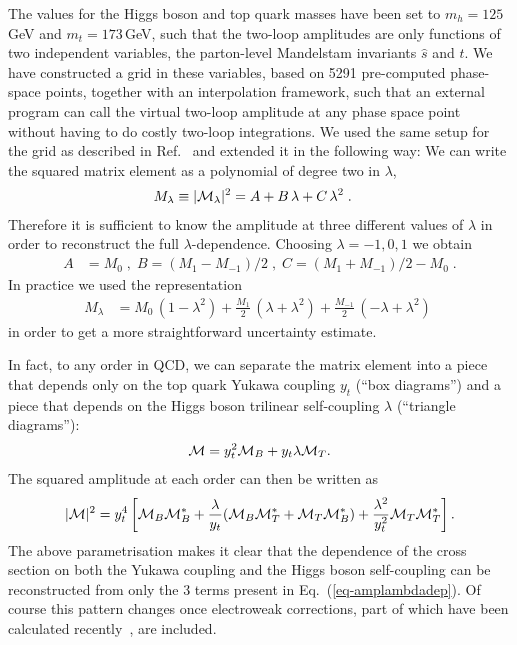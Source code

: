 The values for the Higgs boson and top quark masses have been set to
$m_h=125$\,GeV and $m_t=173$\,GeV, such that the two-loop amplitudes
are only functions of two independent variables, the parton-level Mandelstam invariants
$\hat{s}$ and $\hat{t}$.  We have constructed a grid in these
variables, based on 5291 pre-computed phase-space points, together with an interpolation framework, such that an
external program can call the virtual two-loop amplitude at any phase space
point without having to do costly two-loop integrations.
We used the same setup for the grid as described in Ref.~\cite{Heinrich:2017kxx} and extended it in the following way:
We can write the squared matrix element as a polynomial of degree two in $\lambda$, 
\begin{align}
M_\lambda& \equiv |{\cal M}_\lambda|^2=A+B\,\lambda + C\,\lambda^2\;. \label{eq-amplambdadep}
\end{align}
Therefore it is sufficient to know the amplitude at three different values of $\lambda$ in order to reconstruct the full $\lambda$-dependence. 
Choosing $\lambda=-1,0,1$ we obtain
\begin{align}
A&=M_0\;,\; B=(M_1-M_{-1})/2\;,\; C=(M_1+M_{-1})/2-M_0\;.
\end{align}
In practice we used the representation 
\begin{align}
M_\lambda &=M_0\,(1-\lambda^2)+\frac{M_1}{2}\,(\lambda+\lambda^2) + \frac{M_{-1}}{2}\,(-\lambda+\lambda^2)\;
\end{align}
in order to get a more straightforward uncertainty estimate.

In fact, to any order in QCD,  we can separate the matrix element into a 
piece that depends only on the top quark Yukawa coupling $y_t$ (``box diagrams'') and a 
piece that depends on the Higgs boson trilinear self-coupling $\lambda$ (``triangle diagrams''):
\begin{align}
{\cal M} = y_t^2 {\cal M}_B + y_t \lambda {\cal M}_T.
\end{align}
The squared amplitude at each order can then be written as
\begin{align}
|{\cal M}|^2 = y_t^4 \left[ {\cal M}_B {\cal M}_B^* + \frac{\lambda}{y_t} ({\cal M}_B {\cal M}_T^* + {\cal M}_T {\cal M}_B^* ) +  \frac{\lambda^2}{y_t^2} {\cal M}_T {\cal M}_T^*  \right].\label{eq:yt}
\end{align}
The above parametrisation makes it clear that the dependence of the cross section on
both the Yukawa coupling and the Higgs boson self-coupling can be reconstructed
from only the 3 terms present in Eq.~(\ref{eq-amplambdadep}).
Of course this pattern changes once electroweak corrections, part of which have been calculated recently~\cite{Bizon:2018syu,Borowka:2018pxx}, are included. 

